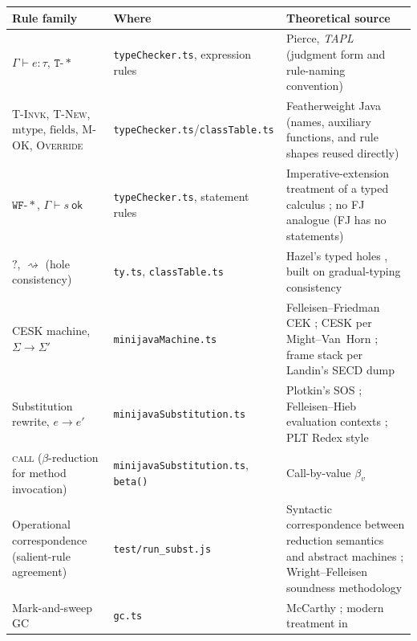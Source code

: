 \documentclass[11pt]{article}
\newcommand{\rulename}[1]{\textsc{#1}}
\newcommand{\Asg}[2]{#1 \mathrel{\rightsquigarrow} #2}  %
\newcommand{\mtype}{\mathrm{mtype}}
\newcommand{\fields}{\mathrm{fields}}
\newcommand{\Hole}{\mathord{?}}
\begin{document}
\begin{longtable}{@{}p{2.6cm}p{5.4cm}p{6.7cm}@{}}
\toprule
\textbf{Rule family} & \textbf{Where} & \textbf{Theoretical source} \\
\midrule
\endhead
$\Gamma \vdash e:\tau$, $\mathtt{T}\text{-}\ast$ &
  \texttt{typeChecker.ts}, expression rules &
  Pierce, \emph{TAPL} \cite{pierce2002tapl} (judgment form and rule-naming
  convention) \\
\rulename{T-Invk}, \rulename{T-New}, $\mtype$, $\fields$, \rulename{M-OK},
  \rulename{Override} &
  \texttt{typeChecker.ts}/\texttt{classTable.ts} &
  Featherweight Java \cite{igarashi2001fj} (names, auxiliary functions, and
  rule shapes reused directly) \\
$\mathtt{WF}\text{-}\ast$, $\Gamma \vdash s\ \mathsf{ok}$ &
  \texttt{typeChecker.ts}, statement rules &
  Imperative-extension treatment of a typed calculus \cite[Ch.~13]{pierce2002tapl};
  no FJ analogue (FJ has no statements) \\
$\Hole$, $\Asg{}{}$ (hole consistency) &
  \texttt{ty.ts}, \texttt{classTable.ts} &
  Hazel's typed holes \cite{omar2017hazelnut,omar2019livelits}, built on
  gradual-typing consistency \cite{siek2006gradual} \\
CESK machine, $\Sigma \longrightarrow \Sigma'$ &
  \texttt{minijavaMachine.ts} &
  Felleisen--Friedman CEK \cite{felleisen1986control}; CESK per
  Might--Van~Horn \cite{mightvanhorn2010aam}; frame stack per Landin's SECD
  dump \cite{landin1964scpp} \\
Substitution rewrite, $e \longrightarrow e'$ &
  \texttt{minijavaSubstitution.ts} &
  Plotkin's SOS \cite{plotkin1981sos}; Felleisen--Hieb evaluation contexts
  \cite{felleisenhieb1992}; PLT Redex style \cite{felleisenfindlerflatt2009redex} \\
\rulename{call} ($\beta$-reduction for method invocation) &
  \texttt{minijavaSubstitution.ts}, \texttt{beta()} &
  Call-by-value $\beta_v$ \cite{plotkin1975callccv} \\
Operational correspondence (salient-rule agreement) &
  \texttt{test/run\_subst.js} &
  Syntactic correspondence between reduction semantics and abstract
  machines \cite{danvy2004rational,ageefsen2003refocusing};
  Wright--Felleisen soundness methodology \cite{wrightfelleisen1994syntactic} \\
Mark-and-sweep GC &
  \texttt{gc.ts} &
  McCarthy \cite{mccarthy1960recursive}; modern treatment in
  \cite{jgh2011gchandbook} \\
\bottomrule
\end{longtable}
\end{document}
